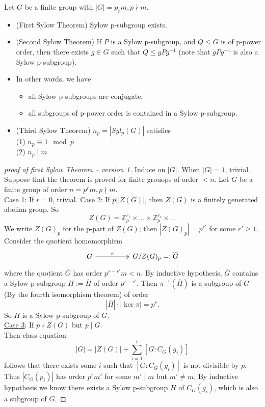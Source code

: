 \documentclass[11pt,fleqn]{book} %
\begin{document}
\begin{CJK}{UTF8}{gkai}
\begin{theorem}
	Let $G$ be a finite group with $|G| = p_rm,p\nmid m$. \\
	\begin{itemize}
		\item (First Sylow Theorem) Sylow p-subgroup exists. 
		\item (Second Sylow Theorem) If $P$ is a Sylow p-subgroup, and $Q \leq G$ is of p-power order, then there exists $g \in G$ such that $Q \leq gPg^{-1}$ (note that $gPg^{-1}$ is also a Sylow p-subgroup).
		\item In other words, we have \begin{itemize}
			\item all Sylow p-subgroups are conjugate.
			\item all subgroups of p-power order is contained in a Sylow p-subgroup.
		\end{itemize}
		\item (Third Sylow Theorem) $n_p = |Syl_p(G)|$ satisfies \\
		(1) $n_p \equiv 1\mod p$ \\
		(2) $n_p \mid m$
	\end{itemize}	
\end{theorem}

\begin{proof}
	[proof of first Sylow Theorem -- version 1]
	Induce on $|G|$. When $|G| = 1$, trivial. \\
	Suppose that the theorem is proved for finite grouops of order $< n$. Let $G$ be a finite group of order $n=p^rm, p \nmid m$. \\
	\underline{Case 1}: If $r = 0$, trivial.
	\underline{Case 2}: If $p | |Z(G)|$, then $Z(G)$ is a finitely generated abelian group. So 
	\[Z(G) = \mathbb{Z}_p^{r_1} \times ... \times \mathbb{Z}_p^{r_s} \times ...\]
	We write $Z(G)_p$ for the p-part of $Z(G)$; then $|Z(G)_p| = p^{r'}$ for some $r' \geq 1$. \\
	Consider the quotient homomorphism \[\begin{tikzcd}
		G && {G/Z(G)_p=:\overline{G}}
		\arrow["\pi", two heads, from=1-1, to=1-3]
	\end{tikzcd}\]
	where the quotient $\overline{G}$ has order $p^{r-r'}m<n$. By inductive hypothesis, $\overline{G}$ contains a Sylow p-subgroup $H := \overline{H}$ of order $p^{r-r'}$. Then $\pi^{-1}(\overline{H})$ is a subgroup of $G$ (By the fourth isomorphism theorem) of order 
	\[|\overline{H}|\cdot |\ker \pi| = p^r.\]
	So $H$ is a Sylow p-subgroup of $G$.  \\
	\underline{Case 3}: If $p \nmid Z(G)$ but $p \mid G$. \\
	Then class equation 
	\[|G| = |Z(G)| + \sum_{i=1}^t [G:C_G(g_i)]\]
	follows that there exists some $i$ such that $[G : C_G(g_i)]$ is not divisible by $p$. Thus $|C_G(p_i)|$ has order $p^r m'$ for some $m' \mid m$ but $m' \neq m$.
	By inductive hypothesis we know there exists a Sylow p-subgroup $H$ of $C_G(g_i)$, which is also a subgroup of $G$.
\end{proof} 


\end{CJK}
\end{document}
